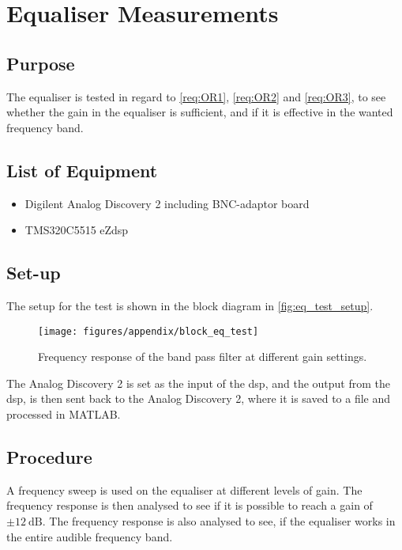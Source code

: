 \chapter{Equaliser Measurements}\label{eq_meas_app}

\section{Purpose}
The equaliser is tested in regard to \autoref{req:OR1}, \autoref{req:OR2} and \autoref{req:OR3}, to see whether the gain in the equaliser is sufficient, and if it is effective in the wanted frequency band. 

\section{List of Equipment}
\begin{itemize}
	\item{Digilent Analog Discovery 2 including BNC-adaptor board}
	\item{TMS320C5515 eZdsp}
\end{itemize}

\section{Set-up}
The setup for the test is shown in the block diagram in \autoref{fig:eq_test_setup}. 

\begin{figure}[H]
	\centering
	\texttt{[image: figures/appendix/block\_eq\_test]}
	\caption{Frequency response of the band pass filter at different gain settings.}
	\label{fig:eq_test_setup}
\end{figure}

The Analog Discovery 2 is set as the input of the \gls{dsp}, and the output from the \gls{dsp}, is then sent back to the Analog Discovery 2, where it is saved to a file and processed in MATLAB.

\section{Procedure}
A frequency sweep is used on the equaliser at different levels of gain. The frequency response is then analysed to see if it is possible to reach a gain of $\pm \SI{12}{\deci\bel}$. The frequency response is also analysed to see, if the equaliser works in the entire audible frequency band.
 
